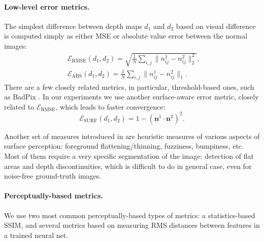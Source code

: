\paragraph{Low-level error metrics.}  
The simplest difference between depth maps $d_1$ and $d_2$ based on visual difference is computed simply as either MSE or absolute value error between the normal images:
\begin{align*}
&\mathcal{E}_{\mathrm{RMSE}}(d_1,d_2) = \sqrt{\frac{1}{N}\sum_{i,j} \| n_{ij}^1- n_{ij}^2\|^2_2},\; \\
&\mathcal{E}_{\mathrm{ABS}}(d_1,d_2) = \frac{1}{N}\sum_{i,j} \| n_{ij}^1- n_{ij}^2\|_1.
\end{align*}  
There are a few closely related metrics, in particular, threshold-based ones, such as BadPix \cite{honauer2015hci}.
In our experiments we use another surface-aware error metric, closely related to \(\mathcal{E}_{\mathrm{RMSE}}\), which leads to faster convergence:
\[
\mathcal{E}_{\mathrm{SURF}}(d_1,d_2) = 1 - \left(\bm{n}^{1}\cdot \bm{n}^{2}\right)^2.
\]

Another set of measures introduced in \cite{honauer2015hci} are heuristic measures 
of various aspects of surface perception: foreground flattening/thinning, fuzziness, 
bumpiness, etc.  Most of them require a very specific segmentation of the image: detection of flat areas and depth discontinuities, which is difficult to do in general case, even for noise-free ground-truth images. 



\paragraph{Perceptually-based metrics.}  We use two most common perceptually-based types of metrics: a statistics-based SSIM,  and several metrics based on measuring RMS distances between features in a trained neural net.   

